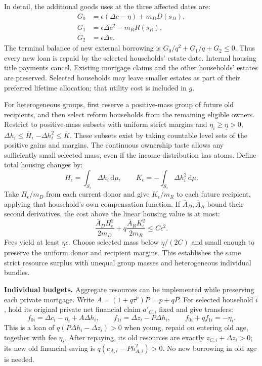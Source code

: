 \documentclass[11pt]{article}
\newcommand{\dd}{\mathrm d}
\begin{document}
In detail, the additional goods uses at the three affected dates are:
\begin{equation}
\begin{aligned}
G_0&=\epsilon(\Delta c-\eta)+m_DD(s_D),\\
G_1&=\epsilon\Delta c^2-m_RR(s_R),\\
G_2&=\epsilon\Delta e.
\end{aligned}
\end{equation}
The terminal balance of new external borrowing is
$G_0/q^2+G_1/q+G_2\le0$. Thus every new loan is repaid by the selected
households' estate date. Internal housing title payments cancel. Existing
mortgage claims and the other households' estates are preserved. Selected
households may leave smaller estates as part of their preferred lifetime
allocation; that utility cost is included in $g$.

For heterogeneous groups, first reserve a positive-mass group of future old
recipients, and then select reform households from the remaining eligible
owners. Restrict to positive-mass subsets with uniform strict margins and
$\eta_i\ge\underline\eta>0$, $\Delta h_i\le\overline H$,
$-\Delta h_i^2\le\overline K$. These subsets exist by taking countable level
sets of the positive gains and margins. The continuous ownership taste allows
any sufficiently small selected mass, even if the income distribution has
atoms. Define total housing changes by:
\begin{equation}
H_\epsilon=\int_{\mathcal S_\epsilon}\Delta h_i\,\dd\mu,
\qquad K_\epsilon=-\int_{\mathcal S_\epsilon}\Delta h_i^2\,\dd\mu.
\end{equation}
Take $H_\epsilon/m_D$ from each current donor and give $K_\epsilon/m_R$ to
each future recipient, applying that household's own compensation function.
If $\overline A_D,\overline A_R$ bound their second derivatives, the cost
above the linear housing value is at most:
\begin{equation}
\frac{\overline A_DH_\epsilon^2}{2m_D}
+q\frac{\overline A_RK_\epsilon^2}{2m_R}
\le C\epsilon^2.
\end{equation}
Fees yield at least $\underline\eta\epsilon$. Choose selected mass below
$\underline\eta/(2C)$ and small enough to preserve the uniform donor and
recipient margins. This establishes the same strict resource surplus with
unequal group masses and heterogeneous individual bundles.

\textbf{Individual budgets.} Aggregate resources can be implemented while
preserving each private mortgage. Write $A=(1+q\tau^p)P=p+qP$.
For selected household $i$, hold its original private net financial claim
$a'_{C,i}$ fixed and give transfers:
\begin{equation}
f_{0i}=\Delta c_i-\eta_i+A\Delta h_i,\qquad
f_{1i}=\Delta z_i-P\Delta h_i,
\qquad f_{0i}+qf_{1i}=-\eta_i.
\end{equation}
This is a loan of $q(P\Delta h_i-\Delta z_i)>0$ when young, repaid on
entering old age, together with fee $\eta_i$. After repaying, its old resources
are exactly $z_{C,i}+\Delta z_i>0$; its new old financial saving is
$q(e_{A,i}-Ph_{A,i}^2)>0$. No new borrowing in old age is needed.
\end{document}
